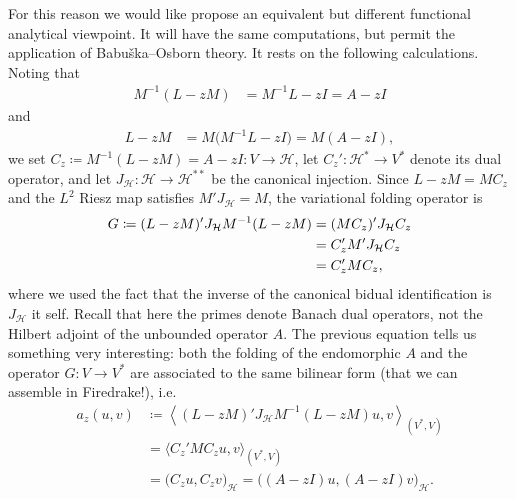 \documentclass[11pt,a4paper]{article}
\begin{document}
For this reason we would like propose an equivalent but different functional analytical viewpoint. It will have the same computations, but permit the
application of Babu\v{s}ka--Osborn theory. It rests on the following calculations. Noting that
\begin{align}
	M^{-1}(L-zM)
	&= M^{-1}L-zI
	= A-zI \label{eq:folding-identity}
\end{align}
and
\begin{align}
	L-zM
	&= M\bigl(M^{-1}L-zI\bigr)
	= M(A-zI),
\end{align}
we set $C_z\coloneqq M^{-1}(L-zM)=A-zI:V\to\mathcal{H}$, let
$C_z':\mathcal{H}^*\to V^*$ denote its dual operator, and let
$J_{\mathcal{H}}:\mathcal{H}\to\mathcal{H}^{**}$ be the canonical injection.
Since $L-zM=MC_z$ and the $L^2$ Riesz map satisfies
$M'J_{\mathcal{H}}=M$, the variational folding operator is
\begin{align}
	G \coloneqq (L-zM)'J_{\mathcal{H}}M^{-1}(L-zM)
	&= (MC_z)'J_{\mathcal{H}}C_z \notag\\
	&= C_z'M'J_{\mathcal{H}}C_z \notag\\
	&= C_z'MC_z, \label{eq:variational-folding}
\end{align}
where we used the fact that the inverse of the canonical bidual identification is $J_{\mathcal{H}}$ it self.
Recall that here the primes denote Banach
dual operators, not the Hilbert adjoint of the unbounded operator $A$. The
previous equation tells us something very interesting: both the folding of
the endomorphic $A$ and the operator $G:V\to V^*$ are associated to the same
bilinear form (that we can assemble in Firedrake!), i.e.
\begin{equation}
	\begin{aligned}
	a_z(u,v)
	&\coloneqq \left\langle
	(L-zM)'J_{\mathcal{H}}M^{-1}(L-zM)u,v
	\right\rangle_{(V^*,V)}\\
	&= \langle C_z'MC_z u,v\rangle_{(V^*,V)}\\
	&= \bigl(C_z u,C_z v\bigr)_{\mathcal{H}}
	= \bigl((A-zI)u,(A-zI)v\bigr)_{\mathcal{H}}.
	\end{aligned}
\end{equation}
\end{document}
